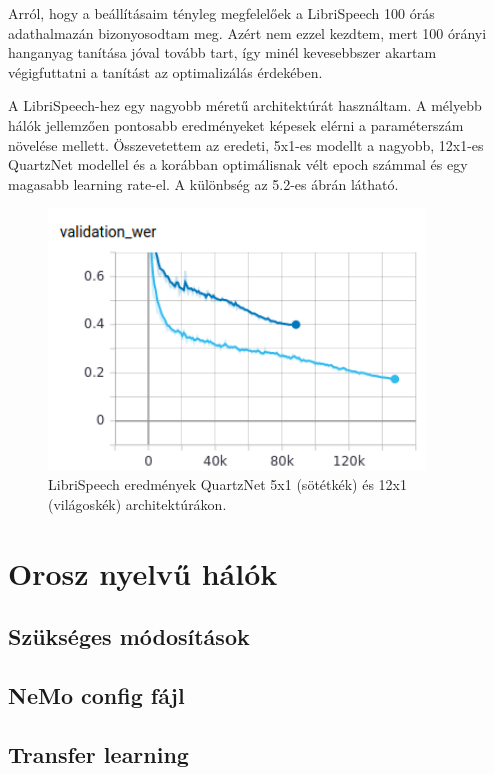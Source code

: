 Arról, hogy a beállításaim tényleg megfelelőek a LibriSpeech 100 órás adathalmazán bizonyosodtam meg. Azért nem ezzel kezdtem, mert 100 órányi hanganyag tanítása jóval tovább tart, így minél kevesebbszer akartam végigfuttatni a tanítást az optimalizálás érdekében.

A LibriSpeech-hez egy nagyobb méretű architektúrát használtam. A mélyebb hálók jellemzően pontosabb eredményeket képesek elérni a paraméterszám növelése mellett. Összevetettem az eredeti, 5x1-es modellt a nagyobb, 12x1-es QuartzNet modellel és a korábban optimálisnak vélt epoch számmal és egy magasabb learning rate-el. A különbség az 5.2-es ábrán látható.

\begin{figure}[!ht]
\centering
\includegraphics[width=100mm, keepaspectratio]{figures/architecture_comparrison.png}
\caption{LibriSpeech eredmények QuartzNet 5x1 (sötétkék) és 12x1 (világoskék) architektúrákon.}
\label{fig:TeXstudio}
\end{figure}

\section{Orosz nyelvű hálók}

\subsection{Szükséges módosítások}

\subsection{NeMo config fájl}

\subsection{Transfer learning}
